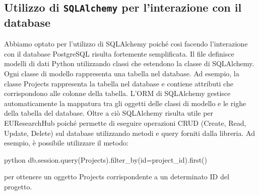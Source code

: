 \documentclass{report}
\begin{document}
\subsection{Utilizzo di \texttt{SQLAlchemy} per l'interazione con il database}
Abbiamo optato per l'utilizzo di SQLAlchemy poiché cosi facendo l'interazione con il database PostgreSQL risulta fortemente semplificata. Il file  definisce modelli di dati Python utilizzando classi che estendono la classe   di SQLAlchemy. Ogni classe di modello rappresenta una tabella nel database.
Ad esempio, la classe Projects rappresenta la tabella  nel database e contiene attributi che corrispondono alle colonne della tabella. L'ORM di SQLAlchemy gestisce automaticamente la mappatura tra gli oggetti delle classi di modello e le righe della tabella del database.
Oltre a ciò SQLAlchemy risulta utile per EUResearchHub poiché permette di eseguire operazioni CRUD (Create, Read, Update, Delete) sul database utilizzando metodi e query forniti dalla libreria. Ad esempio, è possibile utilizzare il metodo:\\
\begin{minipage}{\linewidth}
\begin{imtaCode}{python}
 db.session.query(Projects).filter_by(id=project_id).first() 
     \end{imtaCode}
\end{minipage}
 per ottenere un oggetto Projects corrispondente a un determinato ID del progetto.
\end{document}
